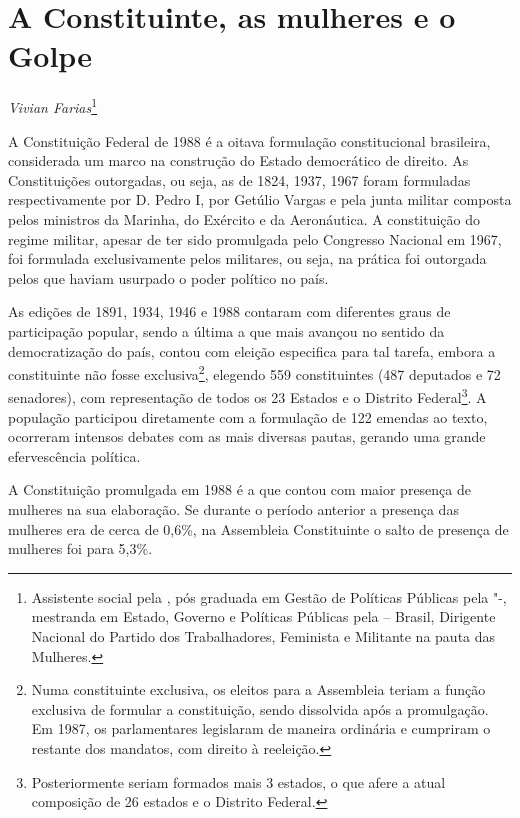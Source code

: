 \chapter*{A Constituinte, as mulheres e o Golpe}


\begin{flushright}
\emph{Vivian Farias}\footnote{Assistente social pela , pós graduada em
  Gestão de Políticas Públicas pela "-, mestranda em Estado,
  Governo e Políticas Públicas pela  -- Brasil, Dirigente Nacional
  do Partido dos Trabalhadores, Feminista e Militante na pauta das
  Mulheres.}
\end{flushright}

A Constituição Federal de 1988 é a oitava formulação constitucional
brasileira, considerada um marco na construção do Estado democrático de
direito. As Constituições outorgadas, ou seja, as de 1824, 1937, 1967
foram formuladas respectivamente por D. Pedro I, por Getúlio Vargas e
pela junta militar composta pelos ministros da Marinha, do Exército e da
Aeronáutica. A constituição do regime militar, apesar de ter sido
promulgada pelo Congresso Nacional em 1967, foi formulada exclusivamente
pelos militares, ou seja, na prática foi outorgada pelos que haviam
usurpado o poder político no país.

As edições de 1891, 1934, 1946 e 1988 contaram com diferentes graus de
participação popular, sendo a última a que mais avançou no sentido da
democratização do país, contou com eleição especifica para tal tarefa,
embora a constituinte não fosse exclusiva\footnote{Numa constituinte
  exclusiva, os eleitos para a Assembleia teriam a função exclusiva de
  formular a constituição, sendo dissolvida após a promulgação. Em 1987,
  os parlamentares legislaram de maneira ordinária e cumpriram o
  restante dos mandatos, com direito à reeleição.}, elegendo 559
constituintes (487 deputados e 72 senadores), com representação de todos
os 23 Estados e o Distrito Federal\footnote{Posteriormente seriam
  formados mais 3 estados, o que afere a atual composição de 26 estados
  e o Distrito Federal.}. A população participou diretamente com a
formulação de 122 emendas ao texto, ocorreram intensos debates com as
mais diversas pautas, gerando uma grande efervescência política.

A Constituição promulgada em 1988 é a que contou com maior presença de
mulheres na sua elaboração. Se durante o período anterior a presença das
mulheres era de cerca de 0,6\%, na Assembleia Constituinte o salto de
presença de mulheres foi para 5,3\%.

